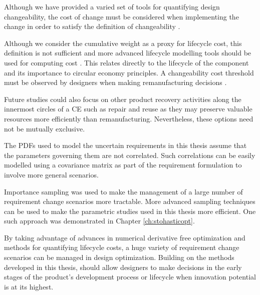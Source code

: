 Although we have provided a varied set of tools for quantifying design changeability, the cost of change must be considered when implementing the change in order to satisfy the definition of changeability \cite{Lawand2019}.

Although we consider the cumulative weight as a proxy for lifecycle cost, this definition is not sufficient and more advanced lifecycle modelling tools should be used for computing cost \cite{Lawand2019}. This relates directly to the lifecycle of the component and its importance to circular economy principles. A changeability cost threshold must be observed by designers when making remanufacturing decisions \cite{Ross2008}. 

Future studies could also focus on other product recovery activities along the innermost circles of a \ac{CE} such as repair and reuse as they may preserve valuable resources more efficiently than remanufacturing. Nevertheless, these options need not be mutually exclusive.

The \acp{PDF} used to model the uncertain requirements in this thesis assume that the parameters governing them are not correlated. Such correlations can be easily modelled using a covariance matrix as part of the requirement formulation to involve more general scenarios. 

Importance sampling was used to make the management of a large number of requirement change scenarios more tractable. More advanced sampling techniques can be used to make the parametric studies used in this thesis more efficient. One such approach was demonstrated in Chapter \ref{ch:stohasticopt}.

By taking advantage of advances in numerical derivative free optimization and methods for quantifying lifecycle costs, a huge variety of requirement change scenarios can be managed in design optimization. Building on the methods developed in this thesis, should allow designers to make decisions in the early stages of the product's development process or lifecycle when innovation potential is at its highest.